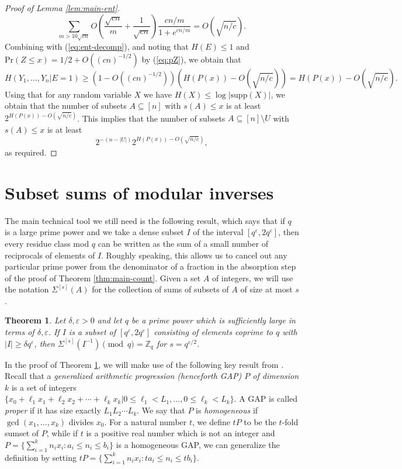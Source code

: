 \documentclass{daj}
\newtheorem{theorem}{Theorem}
\newcommand{\eps}{\varepsilon}
\newcommand{\bZ}{\mathbb{Z}}
\newcommand{\pr}{\mathrm{Pr}}
\begin{document}
\begin{proof}[Proof of Lemma \ref{lem:main-ent}]
\[
    \sum_{m>10\sqrt{cn}} O\left(\frac{\sqrt{cn}}{m} + \frac{1}{\sqrt{cn}}\right) \frac{cn/m}{1+e^{cn/m}} = O(\sqrt{n/c}).
\]
Combining with (\ref{eq:ent-decomp}), and noting that $H(E)\le 1$ and $\pr(Z\le x) = 1/2 + O((cn)^{-1/2})$ by (\ref{eq:pZ}), we obtain that 
\[
    H(Y_1,\dots,Y_n|E=1) \ge (1-O((cn)^{-1/2}))(H(P(x)) - O(\sqrt{n/c})) = H(P(x)) - O(\sqrt{n/c}).
\]
Using that for any random variable $X$ we have $H(X)\le \log |\mathrm{supp}(X)|$, we obtain that the number of subsets $A\subseteq [n]$ with $s(A) \le x$ is at least $2^{H(P(x)) - O(\sqrt{n/c})}$. This implies that the number of subsets $A\subseteq [n]\setminus U$ with $s(A)\le x$ is at least 
\[
    2^{-(n-|U|)} 2^{H(P(x)) - O(\sqrt{n/c})},
\]
as required. 
\end{proof}



\section{Subset sums of modular inverses}

The main technical tool we still need is the following result, which says that if $q$ is a large prime power and we take a dense subset $I$ of the interval $[q^{\eps}, 2q^{\eps}]$, then every residue class mod $q$ can be written as the sum of a small number of reciprocals of elements of $I$. 
Roughly speaking, this allows us to cancel out any particular prime power from the denominator of a fraction in the absorption step of the proof of Theorem \ref{thm:main-count}. Given a set $A$ of integers, we will use the notation $\Sigma^{[s]}(A)$ for the collection of sums of subsets of $A$ of size at most $s$. 

\begin{theorem}
\label{thm:main}
Let $\delta, \eps>0$ and let $q$ be a prime power which is sufficiently large in terms of $\delta, \eps$. If $I$ is a subset of $[q^{\eps}, 2q^{\eps}]$ consisting of elements coprime to $q$ with $|I| \ge \delta q^{\eps}$, then $\Sigma^{[s]}(I^{-1}) \pmod q = \bZ_q$ for $s = q^{\eps/2}$.  
\end{theorem}

In the proof of Theorem \ref{thm:main}, we will make use of the following key result from \cite{CFP}. Recall that a \textit{generalized arithmetic progression (henceforth GAP) $P$ of dimension $k$} is a set of integers $\{x_0 + \ell_1 x_1 + \ell_2 x_2 + \cdots + \ell_k x_k | 0 \le \ell_1 < L_1, \ldots, 0 \le \ell_k < L_k\}$. A GAP is called \textit{proper} if it has size exactly $L_1 L_2\cdots L_k$. We say that $P$ is \textit{homogeneous} if $\gcd(x_1,\dots,x_k)$ divides $x_0$. For a natural number $t$, we define $tP$ to be the $t$-fold sumset of $P$, while if $t$ is a positive real number which is not an integer and $P = \{\sum_{i=1}^k n_i x_i : a_i \le n_i \leq b_i\}$ is a homogeneous GAP, we can generalize the definition by setting $tP = \{\sum_{i=1}^k n_i x_i : ta_i \le n_i \leq tb_i\}$. 
\end{document}
